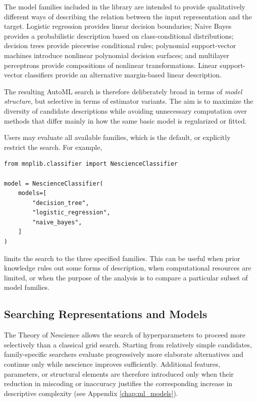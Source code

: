 The model families included in the library are intended to provide qualitatively different ways of describing the relation between the input representation and the target. Logistic regression provides linear decision boundaries; Naive Bayes provides a probabilistic description based on class-conditional distributions; decision trees provide piecewise conditional rules; polynomial support-vector machines introduce nonlinear polynomial decision surfaces; and multilayer perceptrons provide compositions of nonlinear transformations. Linear support-vector classifiers provide an alternative margin-based linear description.

The resulting AutoML search is therefore deliberately broad in terms of \emph{model structure}, but selective in terms of estimator variants. The aim is to maximize the diversity of candidate descriptions while avoiding unnecessary computation over methods that differ mainly in how the same basic model is regularized or fitted.

Users may evaluate all available families, which is the default, or explicitly restrict the search. For example,

\begin{sourcecode}
{\scriptsize
\begin{verbatim}
from mnplib.classifier import NescienceClassifier

model = NescienceClassifier(
    models=[
        "decision_tree",
        "logistic_regression",
        "naive_bayes",
    ]
)
\end{verbatim}}
\end{sourcecode}

limits the search to the three specified families. This can be useful when prior knowledge rules out some forms of description, when computational resources are limited, or when the purpose of the analysis is to compare a particular subset of model families.


\subsection*{Searching Representations and Models}

The Theory of Nescience allows the search of hyperparameters to proceed more selectively than a classical grid search. Starting from relatively simple candidates, family-specific searchers evaluate progressively more elaborate alternatives and continue only while nescience improves sufficiently. Additional features, parameters, or structural elements are therefore introduced only when their reduction in miscoding or inaccuracy justifies the corresponding increase in descriptive complexity (see Appendix \ref{chap:ml_models}).

